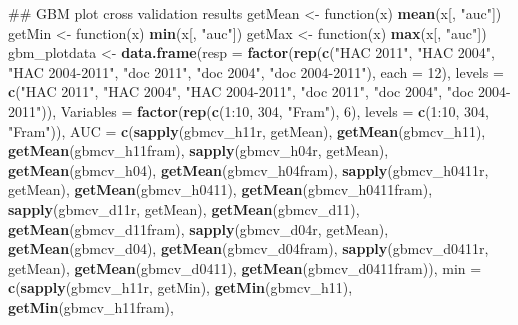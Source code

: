 \documentclass[11pt,]{article}
\newenvironment{Shaded}{\begin{snugshade}}{\end{snugshade}}
\newcommand{\KeywordTok}[1]{\textcolor[rgb]{0.13,0.29,0.53}{\textbf{{#1}}}}
\newcommand{\DataTypeTok}[1]{\textcolor[rgb]{0.13,0.29,0.53}{{#1}}}
\newcommand{\DecValTok}[1]{\textcolor[rgb]{0.00,0.00,0.81}{{#1}}}
\newcommand{\StringTok}[1]{\textcolor[rgb]{0.31,0.60,0.02}{{#1}}}
\newcommand{\NormalTok}[1]{{#1}}
\begin{document}
\begin{Shaded}
\begin{Highlighting}[]
{\NormalTok{## GBM plot cross validation results}
\NormalTok{getMean <-}\StringTok{ }\NormalTok{function(x) }\KeywordTok{mean}\NormalTok{(x[, }\StringTok{"auc"}\NormalTok{])}
\NormalTok{getMin <-}\StringTok{ }\NormalTok{function(x) }\KeywordTok{min}\NormalTok{(x[, }\StringTok{"auc"}\NormalTok{])}
\NormalTok{getMax <-}\StringTok{ }\NormalTok{function(x) }\KeywordTok{max}\NormalTok{(x[, }\StringTok{"auc"}\NormalTok{])}
\NormalTok{gbm_plotdata <-}\StringTok{ }\KeywordTok{data.frame}\NormalTok{(}\DataTypeTok{resp =} \KeywordTok{factor}\NormalTok{(}\KeywordTok{rep}\NormalTok{(}\KeywordTok{c}\NormalTok{(}\StringTok{"HAC 2011"}\NormalTok{, }\StringTok{"HAC 2004"}\NormalTok{, }\StringTok{"HAC 2004-2011"}\NormalTok{, }
    \StringTok{"doc 2011"}\NormalTok{, }\StringTok{"doc 2004"}\NormalTok{, }\StringTok{"doc 2004-2011"}\NormalTok{), }\DataTypeTok{each =} \DecValTok{12}\NormalTok{), }\DataTypeTok{levels =} \KeywordTok{c}\NormalTok{(}\StringTok{"HAC 2011"}\NormalTok{, }
    \StringTok{"HAC 2004"}\NormalTok{, }\StringTok{"HAC 2004-2011"}\NormalTok{, }\StringTok{"doc 2011"}\NormalTok{, }\StringTok{"doc 2004"}\NormalTok{, }\StringTok{"doc 2004-2011"}\NormalTok{)), }
    \DataTypeTok{Variables =} \KeywordTok{factor}\NormalTok{(}\KeywordTok{rep}\NormalTok{(}\KeywordTok{c}\NormalTok{(}\DecValTok{1}\NormalTok{:}\DecValTok{10}\NormalTok{, }\DecValTok{304}\NormalTok{, }\StringTok{"Fram"}\NormalTok{), }\DecValTok{6}\NormalTok{), }\DataTypeTok{levels =} \KeywordTok{c}\NormalTok{(}\DecValTok{1}\NormalTok{:}\DecValTok{10}\NormalTok{, }\DecValTok{304}\NormalTok{, }\StringTok{"Fram"}\NormalTok{)), }
    \DataTypeTok{AUC =} \KeywordTok{c}\NormalTok{(}\KeywordTok{sapply}\NormalTok{(gbmcv_h11r, getMean), }\KeywordTok{getMean}\NormalTok{(gbmcv_h11), }\KeywordTok{getMean}\NormalTok{(gbmcv_h11fram), }
        \KeywordTok{sapply}\NormalTok{(gbmcv_h04r, getMean), }\KeywordTok{getMean}\NormalTok{(gbmcv_h04), }\KeywordTok{getMean}\NormalTok{(gbmcv_h04fram), }
        \KeywordTok{sapply}\NormalTok{(gbmcv_h0411r, getMean), }\KeywordTok{getMean}\NormalTok{(gbmcv_h0411), }\KeywordTok{getMean}\NormalTok{(gbmcv_h0411fram), }
        \KeywordTok{sapply}\NormalTok{(gbmcv_d11r, getMean), }\KeywordTok{getMean}\NormalTok{(gbmcv_d11), }\KeywordTok{getMean}\NormalTok{(gbmcv_d11fram), }
        \KeywordTok{sapply}\NormalTok{(gbmcv_d04r, getMean), }\KeywordTok{getMean}\NormalTok{(gbmcv_d04), }\KeywordTok{getMean}\NormalTok{(gbmcv_d04fram), }
        \KeywordTok{sapply}\NormalTok{(gbmcv_d0411r, getMean), }\KeywordTok{getMean}\NormalTok{(gbmcv_d0411), }\KeywordTok{getMean}\NormalTok{(gbmcv_d0411fram)), }
    \DataTypeTok{min =} \KeywordTok{c}\NormalTok{(}\KeywordTok{sapply}\NormalTok{(gbmcv_h11r, getMin), }\KeywordTok{getMin}\NormalTok{(gbmcv_h11), }\KeywordTok{getMin}\NormalTok{(gbmcv_h11fram), }
}
\end{Highlighting}
\end{Shaded}
\end{document}
